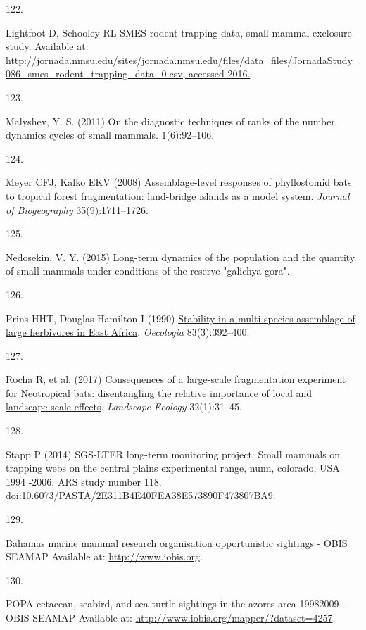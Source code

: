 \documentclass{article}
\newlength{\cslhangindent}
\newlength{\csllabelwidth}
\newlength{\cslentryspacingunit} %
\newenvironment{CSLReferences}[2] %
 {%
  \setlength{\parindent}{0pt}
  \ifodd #1
  \let\oldpar\par
  \def\par{\hangindent=\cslhangindent\oldpar}
  \fi
  \setlength{\parskip}{#2\cslentryspacingunit}
 }%
 {}
\newcommand{\CSLLeftMargin}[1]{\parbox[t]{\csllabelwidth}{#1}}
\newcommand{\CSLRightInline}[1]{\parbox[t]{\linewidth - \csllabelwidth}{#1}\break}
\begin{document}
\begin{CSLReferences}{0}{0}
\leavevmode{}%
\CSLLeftMargin{122. }%
\CSLRightInline{Lightfoot D, Schooley RL SMES rodent trapping data,
small mammal exclosure study. Available at:
\href{http://jornada.nmsu.edu/sites/jornada.nmsu.edu/files/data_files/JornadaStudy_086_smes_rodent_trapping_data_0.csv,\%20accessed\%202016.}{http://jornada.nmsu.edu/sites/jornada.nmsu.edu/files/data\_files/JornadaStudy\_086\_smes\_rodent\_trapping\_data\_0.csv,
accessed 2016.}}

\leavevmode{}%
\CSLLeftMargin{123. }%
\CSLRightInline{Malyshev, Y. S. (2011) On the diagnostic techniques of
ranks of the number dynamics cycles of small mammals. 1(6):92--106.}

\leavevmode{}%
\CSLLeftMargin{124. }%
\CSLRightInline{Meyer CFJ, Kalko EKV (2008)
\href{https://doi.org/10.1111/j.1365-2699.2008.01916.x}{Assemblage-level
responses of phyllostomid bats to tropical forest fragmentation:
land-bridge islands as a model system}. \emph{Journal of Biogeography}
35(9):1711--1726.}

\leavevmode{}%
\CSLLeftMargin{125. }%
\CSLRightInline{Nedosekin, V. Y. (2015) Long-term dynamics of the
population and the quantity of small mammals under conditions of the
reserve {"}galichya gora{"}.}

\leavevmode{}%
\CSLLeftMargin{126. }%
\CSLRightInline{Prins HHT, Douglas-Hamilton I (1990)
\href{https://doi.org/10.1007/BF00317566}{Stability in a multi-species
assemblage of large herbivores in East Africa}. \emph{Oecologia}
83(3):392--400.}

\leavevmode{}%
\CSLLeftMargin{127. }%
\CSLRightInline{Rocha R, et al. (2017)
\href{https://doi.org/10.1007/s10980-016-0425-3}{Consequences of a
large-scale fragmentation experiment for Neotropical bats: disentangling
the relative importance of local and landscape-scale effects}.
\emph{Landscape Ecology} 32(1):31--45.}

\leavevmode{}%
\CSLLeftMargin{128. }%
\CSLRightInline{Stapp P (2014) SGS-LTER long-term monitoring project:
Small mammals on trapping webs on the central plains experimental range,
nunn, colorado, USA 1994 -2006, ARS study number 118.
doi:\href{https://doi.org/10.6073/PASTA/2E311B4E40FEA38E573890F473807BA9}{10.6073/PASTA/2E311B4E40FEA38E573890F473807BA9}.}

\leavevmode{}%
\CSLLeftMargin{129. }%
\CSLRightInline{Bahamas marine mammal research organisation
opportunistic sightings - OBIS SEAMAP Available at:
\url{http://www.iobis.org}.}

\leavevmode{}%
\CSLLeftMargin{130. }%
\CSLRightInline{POPA cetacean, seabird, and sea turtle sightings in the
azores area 1998{\textendash}2009 - OBIS SEAMAP Available at:
\url{http://www.iobis.org/mapper/?dataset=4257}.}

\end{CSLReferences}



\end{document}
